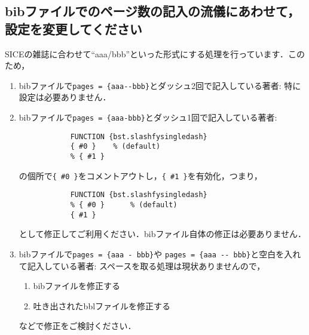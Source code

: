 \documentclass[a4j,fleqn,dvipdfmx,twocolumn]{jsarticle}
\begin{document}
\subsection{bibファイルでのページ数の記入の流儀にあわせて，設定を変更してください}
SICEの雑誌に合わせて``aaa/bbb''といった形式にする処理を行っています．このため，
\begin{enumerate}
	\item bibファイルで\verb+pages = {aaa--bbb}+とダッシュ2回で記入している著者:
	      特に設定は必要ありません．
	\item bibファイルで\verb+pages = {aaa-bbb}+とダッシュ1回で記入している著者:
	      \begin{verbatim}
	      	FUNCTION {bst.slashfysingledash}
	      	{ #0 }	  % (default)
	      	% { #1 }
	      \end{verbatim}
	      の個所で\verb+{ #0 }+をコメントアウトし，\verb+{ #1 }+を有効化，つまり，
	      \begin{verbatim}
	      	FUNCTION {bst.slashfysingledash}
	      	% { #0 }	  % (default)
	      	{ #1 }
	      \end{verbatim}
	      として修正してご利用ください．bibファイル自体の修正は必要ありません．
	\item bibファイルで\verb+pages = {aaa - bbb}+や
	      \verb+pages = {aaa -- bbb}+と空白を入れて記入している著者:
	      スペースを取る処理は現状ありませんので，
	      \begin{enumerate}
		      \item bibファイルを修正する
		      \item 吐き出されたbblファイルを修正する
	      \end{enumerate}
	      などで修正をご検討ください．
\end{enumerate}


\end{document}
